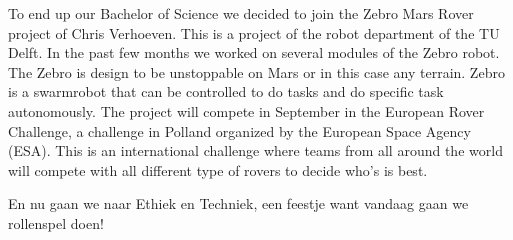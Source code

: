 \documentclass{article}
\begin{document}
To end up our Bachelor of Science we decided to join the Zebro Mars Rover project of Chris Verhoeven. This is a project of the robot department of the TU Delft.
In the past few months we worked on several modules of the Zebro robot. The Zebro is design to be unstoppable on Mars or in this case any terrain.
Zebro is a swarmrobot that can be controlled to do tasks and do specific task autonomously. The project will compete in September in the European Rover Challenge, a challenge in Polland organized by the European Space Agency (ESA).
This is an international challenge where teams from all around the world will compete with all different type of rovers to decide who's is best.

En nu gaan we naar Ethiek en Techniek, een feestje want vandaag gaan we rollenspel doen!
\end{document}
